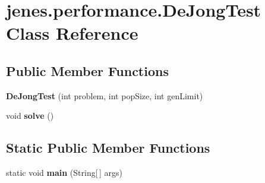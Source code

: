 \hypertarget{classjenes_1_1performance_1_1_de_jong_test}{\section{jenes.\-performance.\-De\-Jong\-Test Class Reference}
\label{classjenes_1_1performance_1_1_de_jong_test}
}
\subsection*{Public Member Functions}
\begin{DoxyCompactItemize}
\item 
\hypertarget{classjenes_1_1performance_1_1_de_jong_test_a795332b956040573e1567a687b734c0f}{{\bfseries De\-Jong\-Test} (int problem, int pop\-Size, int gen\-Limit)}\label{classjenes_1_1performance_1_1_de_jong_test_a795332b956040573e1567a687b734c0f}

\item 
\hypertarget{classjenes_1_1performance_1_1_de_jong_test_aac1afb2071483b28a6c55b62bfe32e31}{void {\bfseries solve} ()}\label{classjenes_1_1performance_1_1_de_jong_test_aac1afb2071483b28a6c55b62bfe32e31}

\end{DoxyCompactItemize}
\subsection*{Static Public Member Functions}
\begin{DoxyCompactItemize}
\item 
\hypertarget{classjenes_1_1performance_1_1_de_jong_test_ab226b971a6f791d5a49dd4c2718f81d7}{static void {\bfseries main} (String\mbox{[}$\,$\mbox{]} args)}\label{classjenes_1_1performance_1_1_de_jong_test_ab226b971a6f791d5a49dd4c2718f81d7}

\end{DoxyCompactItemize}
